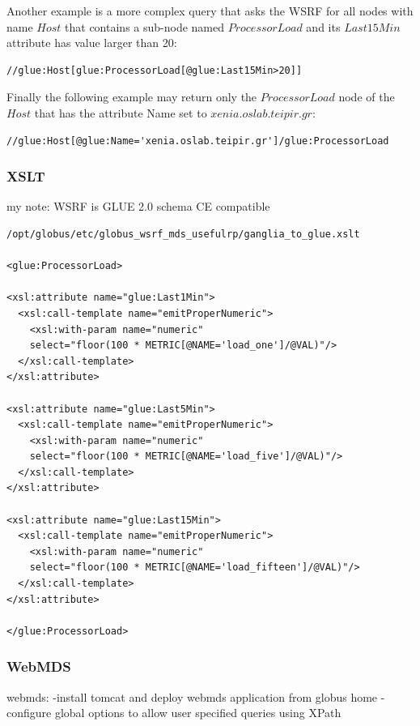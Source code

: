 Another example is a more complex query that asks the WSRF for all nodes with name $Host$ that contains a sub-node named $ProcessorLoad$ and its $Last15Min$ attribute has value larger than 20:
\begin{verbatim}
//glue:Host[glue:ProcessorLoad[@glue:Last15Min>20]]
\end{verbatim}

Finally the following example may return only the $ProcessorLoad$ node of the $Host$ that has the attribute Name set to $xenia.oslab.teipir.gr$:
\begin{verbatim}
//glue:Host[@glue:Name='xenia.oslab.teipir.gr']/glue:ProcessorLoad
\end{verbatim}

\newpage

\subsubsection{XSLT}
my note: WSRF is GLUE 2.0 schema CE compatible
\begin{verbatim}
/opt/globus/etc/globus_wsrf_mds_usefulrp/ganglia_to_glue.xslt

<glue:ProcessorLoad>

<xsl:attribute name="glue:Last1Min">
  <xsl:call-template name="emitProperNumeric">
    <xsl:with-param name="numeric" 
    select="floor(100 * METRIC[@NAME='load_one']/@VAL)"/>
  </xsl:call-template>
</xsl:attribute>

<xsl:attribute name="glue:Last5Min">
  <xsl:call-template name="emitProperNumeric">
    <xsl:with-param name="numeric" 
    select="floor(100 * METRIC[@NAME='load_five']/@VAL)"/>
  </xsl:call-template>
</xsl:attribute>

<xsl:attribute name="glue:Last15Min">
  <xsl:call-template name="emitProperNumeric">
    <xsl:with-param name="numeric" 
    select="floor(100 * METRIC[@NAME='load_fifteen']/@VAL)"/>
  </xsl:call-template>
</xsl:attribute>

</glue:ProcessorLoad>
\end{verbatim}
\newpage

\subsubsection{WebMDS}
webmds:
-install tomcat and deploy webmds application from globus home
-configure global options to allow user specified queries using XPath
